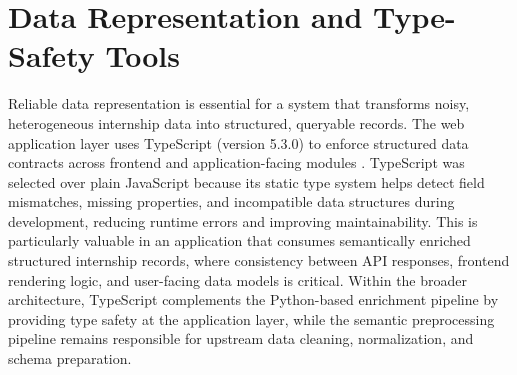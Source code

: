 \section{Data Representation and Type-Safety Tools}
Reliable data representation is essential for a system that transforms noisy, heterogeneous internship data into structured, queryable records. The web application layer uses TypeScript (version 5.3.0) to enforce structured data contracts across frontend and application-facing modules \cite{riva2022realworld, pierce2002types}.
TypeScript was selected over plain JavaScript because its static type system helps detect field mismatches, missing properties, and incompatible data structures during development, reducing runtime errors and improving maintainability. This is particularly valuable in an application that consumes semantically enriched structured internship records, where consistency between API responses, frontend rendering logic, and user-facing data models is critical.
Within the broader architecture, TypeScript complements the Python-based enrichment pipeline by providing type safety at the application layer, while the semantic preprocessing pipeline remains responsible for upstream data cleaning, normalization, and schema preparation.
